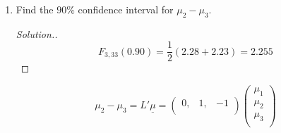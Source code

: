 \documentclass[11pt,a4paper]{article}
\theoremstyle{definition}
\newenvironment{solution}
  {\renewcommand{\qedsymbol}{}\begin{proof}[\textit{Solution}.]}
  {\end{proof}}
\begin{document}
\begin{enumerate}
\begin{align*}
d\big(\overline{X},\underline{\mu}_0\big) & = n\big(\overline{\underline{X}}-\underline{\mu}_0\big)'S^{-1}\big(\overline{\underline{X}}-\underline{\mu}_0\big)\\ 
& = 36 \times 17.4198\\
& = 627.1128>9.164\\
\end{align*}



\begin{figure}[H]
\centering
{}
\end{figure}











So $\underline{\mu}_0=\begin{pmatrix}
50, & 50, & 50\\
\end{pmatrix}'$ is not within the confidence $(95\%)$ region.\\


\item Find the $90\%$ confidence interval for $\mu_2-\mu_3$.\\

\begin{solution}
$$F_{3,33}(0.90)=\frac{1}{2}(2.28+2.23)=2.255$$
\end{solution}

$$\mu_2 - \mu_3 = L'\underline{\mu} = \begin{pmatrix}
0, & 1, & -1\\
\end{pmatrix}
\begin{pmatrix}
\mu_1\\ \mu_2\\ \mu_3\\
\end{pmatrix}
$$


\end{enumerate}
\end{document}
